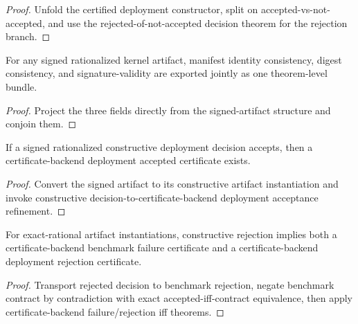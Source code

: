 \begin{proof}
Unfold the certified deployment constructor, split on accepted-vs-not-accepted, and use the rejected-of-not-accepted decision theorem for the rejection branch.
\end{proof}

\begin{theorem}
\label{thm:definitive-signed-rationalized-artifact-manifest-consistency}
For any signed rationalized kernel artifact, manifest identity consistency, digest consistency, and signature-validity are exported jointly as one theorem-level bundle.
\end{theorem}

\begin{proof}
Project the three fields directly from the signed-artifact structure and conjoin them.
\end{proof}

\begin{theorem}
\label{thm:definitive-signed-rationalized-decision-accept-refines-certificate-backend-deployment}
If a signed rationalized constructive deployment decision accepts, then a certificate-backend deployment accepted certificate exists.
\end{theorem}

\begin{proof}
Convert the signed artifact to its constructive artifact instantiation and invoke constructive decision-to-certificate-backend deployment acceptance refinement.
\end{proof}

\begin{theorem}
\label{thm:definitive-exact-rat-rejected-refines-certificate-backend-rejections}
For exact-rational artifact instantiations, constructive rejection implies both a certificate-backend benchmark failure certificate and a certificate-backend deployment rejection certificate.
\end{theorem}

\begin{proof}
Transport rejected decision to benchmark rejection, negate benchmark contract by contradiction with exact accepted-iff-contract equivalence, then apply certificate-backend failure/rejection iff theorems.
\end{proof}

